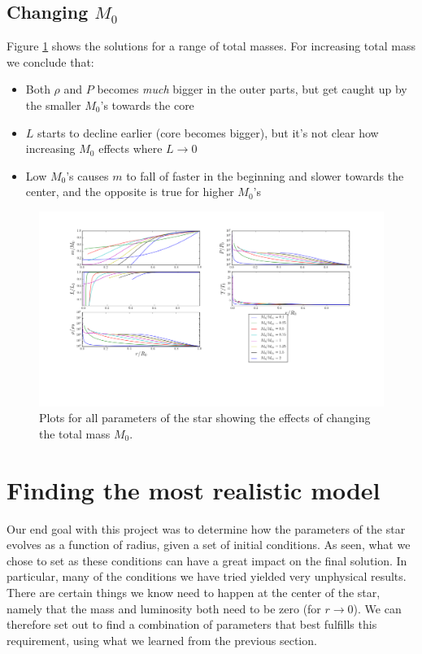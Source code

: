 \documentclass[11pt,twocolumn]{article}
\begin{document}
\subsection{Changing $M_0$}
Figure \ref{fig:M-variation} shows the solutions for a range of total
masses. For increasing total mass we conclude that:

\begin{itemize}
  \item Both $\rho$ and $P$ becomes \emph{much} bigger in the outer
    parts, but get caught up by the smaller $M_0$'s towards the core
  \item $L$ starts to decline earlier (core becomes bigger), but it's
    not clear how increasing $M_0$ effects where $L\rightarrow 0$
  \item Low $M_0$'s causes $m$ to fall of faster in the beginning and
    slower towards the center, and the opposite is true for higher $M_0$'s
\end{itemize}

\begin{figure}[ht]
  \centering
  \includegraphics[width=\linewidth]{fig/M_variation.png}
  \caption{\label{fig:M-variation} Plots for all parameters of the star
  showing the effects of changing the total mass $M_0$.}
\end{figure}


\section{Finding the most realistic model}
Our end goal with this project was to determine how the parameters of
the star evolves as a function of radius, given a set of initial
conditions. As seen, what we chose to set as these conditions can have
a great impact on the final solution. In particular, many of the
conditions we have tried yielded very unphysical results. There are
certain things we know need to happen at the center of the star,
namely that the mass and luminosity both need to be zero (for
$r\rightarrow 0$). We can therefore set out to find a combination of
parameters that best fulfills this requirement, using what we learned
from the previous section. 



\onecolumn
\printbibliography
\end{document}

